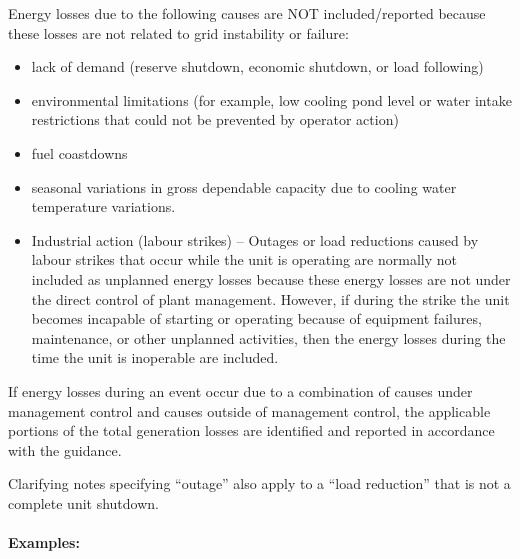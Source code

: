 Energy losses due to the following causes are NOT included/reported
because these losses are not related to grid instability or failure:
\begin{itemize}
\item lack of demand (reserve shutdown, economic shutdown, or load following)
\item environmental limitations (for example, low cooling pond level or water intake restrictions that could not be prevented by operator action)
\item fuel coastdowns
\item seasonal variations in gross dependable capacity due to cooling water temperature variations.
\item Industrial action (labour strikes) – Outages or load reductions
  caused by labour strikes that occur while the unit is operating are
  normally not included as unplanned energy losses because these
  energy losses are not under the direct control of plant
  management. However, if during the strike the unit becomes incapable
  of starting or operating because of equipment failures, maintenance,
  or other unplanned activities, then the energy losses during the
  time the unit is inoperable are included.
\end{itemize}

If energy losses during an event occur due to a combination of causes
under management control and causes outside of management control, the
applicable portions of the total generation losses are identified and
reported in accordance with the guidance.

Clarifying notes specifying “outage” also apply to a “load reduction”
that is not a complete unit shutdown.

\paragraph{Examples:}

